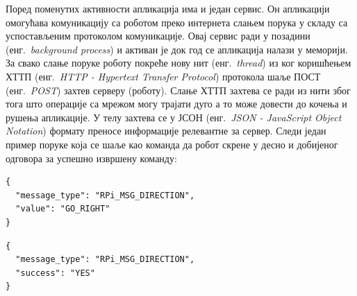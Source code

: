 \documentclass[12pt,oneside]{memoir}
\theoremstyle{remark}
\begin{document}
Поред поменутих активности апликација има и један сервис. Он апликацији омогућава комуникацију са роботом преко интернета слањем порука у складу са успостављеним протоколом комуникације. Овај сервис ради у позадини (енг.~{\em background process}) и активан је док год се апликација налази у меморији. За свако слање поруке роботу покреће нову нит (енг.~{\em thread}) из ког коришћењем ХТТП (енг.~{\em HTTP - Hypertext Transfer Protocol}) протокола шаље ПОСТ (енг.~{\em POST}) захтев серверу (роботу). Слање ХТТП захтева се ради из нити због тога што операције са мрежом могу трајати дуго а то може довести до кочења и рушења апликације. У телу захтева се у ЈСОН (енг.~{\em JSON - JavaScript Object Notation}) формату преносе информације релевантне за сервер. Следи један пример поруке која се шаље као команда да робот скрене у десно и добијеног одговора за успешно извршену команду:


\begin{lstlisting}[caption={Пример захтева који се шаље роботу за скретање у десно},captionpos=b]
{
  "message_type": "RPi_MSG_DIRECTION",
  "value": "GO_RIGHT"
}
\end{lstlisting}

\begin{lstlisting}[caption={Пример одговора који се добија од робота за успешно извршену команду},captionpos=b]
{
  "message_type": "RPi_MSG_DIRECTION",
  "success": "YES"
}
\end{lstlisting}
\end{document}
